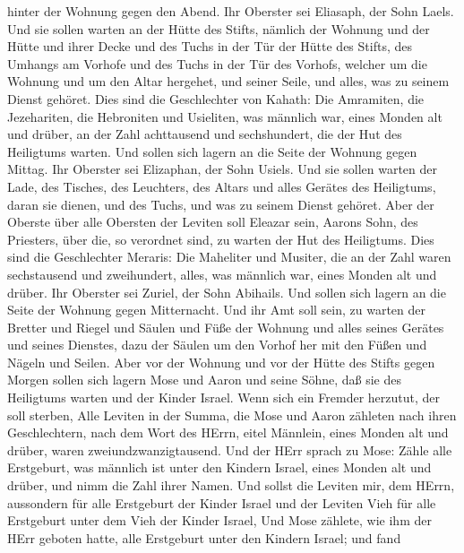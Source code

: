 hinter der Wohnung gegen den Abend.  Ihr Oberster sei
Eliasaph, der Sohn Laels.  Und sie sollen warten an der
Hütte des Stifts, nämlich der Wohnung und der Hütte und ihrer Decke und
des Tuchs in der Tür der Hütte des Stifts,  des Umhangs am
Vorhofe und des Tuchs in der Tür des Vorhofs, welcher um die Wohnung und
um den Altar hergehet, und seiner Seile, und alles, was zu seinem Dienst
gehöret.  Dies sind die Geschlechter von Kahath: Die
Amramiten, die Jezehariten, die Hebroniten und Usieliten, 
was männlich war, eines Monden alt und drüber, an der Zahl achttausend
und sechshundert, die der Hut des Heiligtums warten.  Und
sollen sich lagern an die Seite der Wohnung gegen Mittag. 
Ihr Oberster sei Elizaphan, der Sohn Usiels.  Und sie
sollen warten der Lade, des Tisches, des Leuchters, des Altars und alles
Gerätes des Heiligtums, daran sie dienen, und des Tuchs, und was zu
seinem Dienst gehöret.  Aber der Oberste über alle Obersten
der Leviten soll Eleazar sein, Aarons Sohn, des Priesters, über die, so
verordnet sind, zu warten der Hut des Heiligtums.  Dies
sind die Geschlechter Meraris: Die Maheliter und Musiter, 
die an der Zahl waren sechstausend und zweihundert, alles, was männlich
war, eines Monden alt und drüber.  Ihr Oberster sei Zuriel,
der Sohn Abihails. Und sollen sich lagern an die Seite der Wohnung gegen
Mitternacht.  Und ihr Amt soll sein, zu warten der Bretter
und Riegel und Säulen und Füße der Wohnung und alles seines Gerätes und
seines Dienstes,  dazu der Säulen um den Vorhof her mit den
Füßen und Nägeln und Seilen.  Aber vor der Wohnung und vor
der Hütte des Stifts gegen Morgen sollen sich lagern Mose und Aaron und
seine Söhne, daß sie des Heiligtums warten und der Kinder Israel. Wenn
sich ein Fremder herzutut, der soll sterben,  Alle Leviten
in der Summa, die Mose und Aaron zähleten nach ihren Geschlechtern, nach
dem Wort des HErrn, eitel Männlein, eines Monden alt und drüber, waren
zweiundzwanzigtausend.  Und der HErr sprach zu Mose: Zähle
alle Erstgeburt, was männlich ist unter den Kindern Israel, eines Monden
alt und drüber, und nimm die Zahl ihrer Namen.  Und sollst
die Leviten mir, dem HErrn, aussondern für alle Erstgeburt der Kinder
Israel und der Leviten Vieh für alle Erstgeburt unter dem Vieh der
Kinder Israel,  Und Mose zählete, wie ihm der HErr geboten
hatte, alle Erstgeburt unter den Kindern Israel;  und fand
